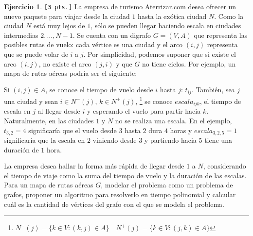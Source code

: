 \documentclass[a4paper,oneside,12pt]{amsart}
\theoremstyle{definition}
\newtheorem{quest}{Ejercicio}
\begin{document}
\begin{quest}
    \verb|[3 pts.]|
    La empresa de turismo Aterrizar.com desea ofrecer un nuevo paquete para viajar desde la ciudad $1$ hasta la
    exótica ciudad $N$. Como la ciudad $N$ está muy lejos de $1$, sólo se pueden llegar haciendo escala en ciudades
    intermedias $2,\dots, N-1$. Se cuenta con un digrafo $G=(V,A)$ que representa las posibles rutas de vuelo: cada
    vértice es
    una ciudad y el arco $(i,j)$ representa que se puede volar de $i$ a $j$. Por simplicidad, podemos suponer que
    si existe el arco $(i,j)$, no existe el arco $(j,i)$ y que $G$ no tiene ciclos. Por ejemplo, un
    mapa de rutas aéreas podría ser el siguiente:
    \begin{center}
    \end{center}

    Si $(i, j)\in A$, se conoce el tiempo de vuelo desde $i$ hasta $j$: $t_{ij}$. También, sea $j$ una ciudad y sean
    $i\in N^{-}(j)$,
    $k\in N^{+}(j)$,
    \footnote{$N^{-}(j)=\{k\in V\colon (k,j)\in A\} \quad N^{+}(j)=\{k\in V\colon (j,k)\in A\}$}
    se conoce $escala_{ijk}$,
    el tiempo de escala en $j$ al llegar desde $i$ y esperando el vuelo para partir hacia $k$.
    Naturalmente, en las ciudades $1$ y $N$ no se realiza una escala.
    En el ejemplo, $t_{3,2}=4$ significaría que el vuelo desde $3$ hasta $2$ dura $4$ horas y $escala_{3,2,5}=1$
    significaría que
    la escala en $2$ viniendo desde $3$ y partiendo hacia $5$ tiene una duración de $1$ hora.

    La empresa desea hallar la forma más rápida de llegar desde $1$ a $N$, considerando el tiempo de viaje como
    la suma del tiempo de vuelo y la duración de las escalas. Para un mapa de rutas aéreas $G$,
    modelar el problema como un problema de grafos, proponer un algoritmo para resolverlo en tiempo polinomial y
    calcular cuál es la cantidad de vértices del grafo con el que se modela el problema.
\end{quest}


\end{document}
